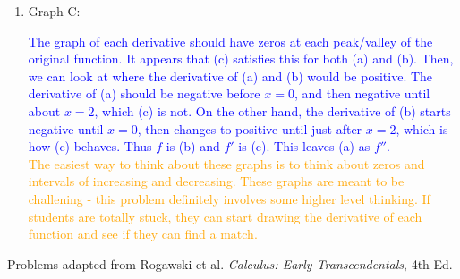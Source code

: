\documentclass{ximera}
\begin{document}
\begin{exercise}
\begin{enumerate}
\begin{image}
\begin{tikzpicture}
            \end{tikzpicture}
        \end{image}
        \item Graph C:
        \begin{image}
        \end{image}
        
        \textcolor{blue}{The graph of each derivative should have zeros at each peak/valley of the original function.  It appears that (c) satisfies this for both (a) and (b).  Then, we can look at where the derivative of (a) and (b) would be positive.  The derivative of (a) should be negative before $x=0$, and then negative until about $x=2$, which (c) is not.  On the other hand, the derivative of (b) starts negative until $x=0$, then changes to positive until just after $x=2$, which is how (c) behaves.  Thus $f$ is (b) and $f'$ is (c).  This leaves (a) as $f''$. }\\
        \textcolor{orange}{The easiest way to think about these graphs is to think about zeros and intervals of increasing and decreasing.  These graphs are meant to be challening - this problem definitely involves some higher level thinking. If students are totally stuck, they can start drawing the derivative of each function and see if they can find a match.}
    \end{enumerate}

\end{exercise}


Problems adapted from Rogawski et al. \textit{Calculus: Early Transcendentals}, 4th Ed. 
\end{document}
